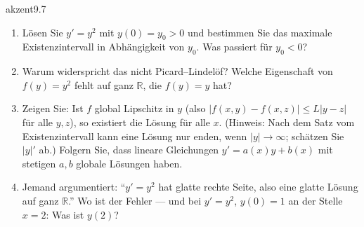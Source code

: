 \begin{karte}{akzent}{9.7}{\typstolper}{}
\begin{enumerate}[label=(\alph*),leftmargin=1.6em,itemsep=2pt]
\item Lösen Sie $y' = y^{2}$ mit $y(0) = y_0 > 0$ und bestimmen Sie das maximale Existenzintervall in Abhängigkeit von $y_0$. Was passiert für $y_0 < 0$?
\item Warum widerspricht das nicht Picard--Lindelöf? Welche Eigenschaft von $f(y) = y^{2}$ fehlt auf ganz $\mathbb R$, die $f(y) = y$ hat?
\item Zeigen Sie: Ist $f$ global Lipschitz in $y$ (also $|f(x, y) - f(x, z)|\le L|y - z|$ für alle $y, z$), so existiert die Lösung für alle $x$. (Hinweis: Nach dem Satz vom Existenzintervall kann eine Lösung nur enden, wenn $|y|\to\infty$; schätzen Sie $|y|'$ ab.) Folgern Sie, dass lineare Gleichungen $y' = a(x)y + b(x)$ mit stetigen $a, b$ globale Lösungen haben.
\item Jemand argumentiert: \enquote{$y' = y^{2}$ hat glatte rechte Seite, also eine glatte Lösung auf ganz $\mathbb R$.} Wo ist der Fehler --- und bei $y' = y^{2}$, $y(0) = 1$ an der Stelle $x = 2$: Was ist $y(2)$?
\end{enumerate}
\end{karte}

